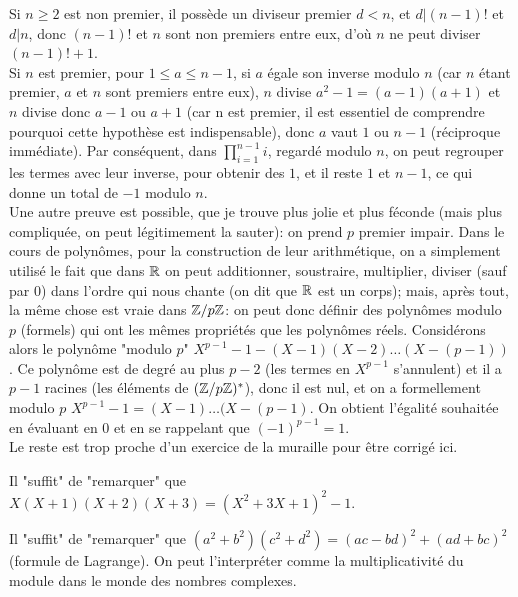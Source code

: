 \begin{sol}[7]
		Si $n \geq 2$ est non premier, il poss\`ede un diviseur premier $d < n$, et $d|(n-1)!$ et $d|n$, donc $(n-1)!$ et $n$ sont non premiers entre eux, d'o\`u $n$ ne peut diviser $(n-1)!+1$. \\
		Si $n$ est premier, pour $1 \leq a \leq n-1$, si $a$ \'egale son inverse modulo $n$ (car $n$ \'etant premier, $a$ et $n$ sont premiers entre eux), $n$ divise $a^2-1=(a-1)(a+1)$ et $n$ divise donc $a-1$ ou $a+1$ (car n est premier, il est essentiel de comprendre pourquoi cette hypoth\`ese est indispensable), donc $a$ vaut $1$ ou $n-1$ (r\'eciproque imm\'ediate). Par cons\'equent, dans $\prod \limits_{i=1}^{n-1}{i}$, regard\'e modulo $n$, on peut regrouper les termes avec leur inverse, pour obtenir des $1$, et il reste $1$ et $n-1$, ce qui donne un total de $-1$ modulo $n$.\\
		Une autre preuve est possible, que je trouve plus jolie et plus f\'econde (mais plus compliqu\'ee, on peut l\'egitimement la sauter): on prend $p$ premier impair. Dans le cours de polyn\^omes, pour la construction de leur arithm\'etique, on a simplement utilis\'e le fait que dans $\mathbb R$ on peut additionner, soustraire, multiplier, diviser (sauf par $0$) dans l'ordre qui nous chante (on dit que $\mathbb R$ est un corps); mais, apr\`es tout, la m\^eme chose est vraie dans $\mathbb Z/p\mathbb Z$: on peut donc d\'efinir des polyn\^omes modulo $p$ (formels) qui ont les m\^emes propri\'et\'es que les polyn\^omes r\'eels. Consid\'erons alors le polyn\^ome "modulo $p$" $X^{p-1}-1-(X-1)(X-2)\ldots(X-(p-1))$. Ce polyn\^ome est de degr\'e au plus $p-2$ (les termes en $X^{p-1}$ s'annulent) et il a $p-1$ racines (les \'el\'ements de $(\mathbb Z/p\mathbb Z)^*$), donc il est nul, et on a formellement modulo $p$ $X^{p-1}-1=(X-1)\ldots(X-(p-1)$. On obtient l'\'egalit\'e souhait\'ee en \'evaluant en $0$ et en se rappelant que $(-1)^{p-1}=1$. \\
		Le reste est trop proche d'un exercice de la muraille pour \^etre corrig\'e ici.
\end{sol}

\begin{sol}[8]
		Il "suffit" de "remarquer" que $X(X+1)(X+2)(X+3)=(X^2+3X+1)^2-1$. 
\end{sol}

\begin{sol}[9]
		Il "suffit" de "remarquer" que $(a^2+b^2)(c^2+d^2)=(ac-bd)^2+(ad+bc)^2$ (formule de Lagrange). On peut l'interpr\'eter comme la multiplicativit\'e du module dans le monde des nombres complexes. 
\end{sol}

